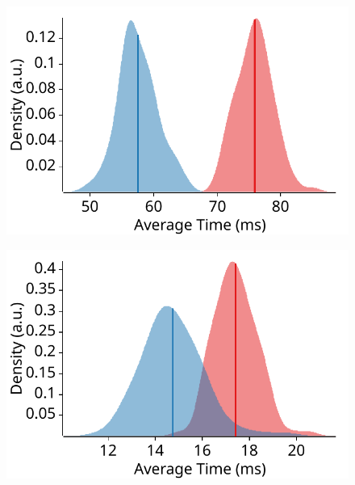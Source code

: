 \begin{figure}[htbp]
\begin{minipage}[c]{0.32\textwidth}
		\label{tokio_spawn_remote_idle}
	\end{minipage}

    \begin{minipage}[c]{0.32\textwidth}
		\centering
		\includegraphics[width=\textwidth]{figures/tokio/yield.pdf}
		\label{tokio_yield}
	\end{minipage}
    \begin{minipage}[c]{0.32\textwidth}
		\centering
		\includegraphics[width=\textwidth]{figures/tokio/ping_pong.pdf}
		\label{tokio_ping_pong}
	\end{minipage}
    \begin{minipage}[c]{0.32\textwidth}
		\centering

\end{minipage}
\end{figure}
